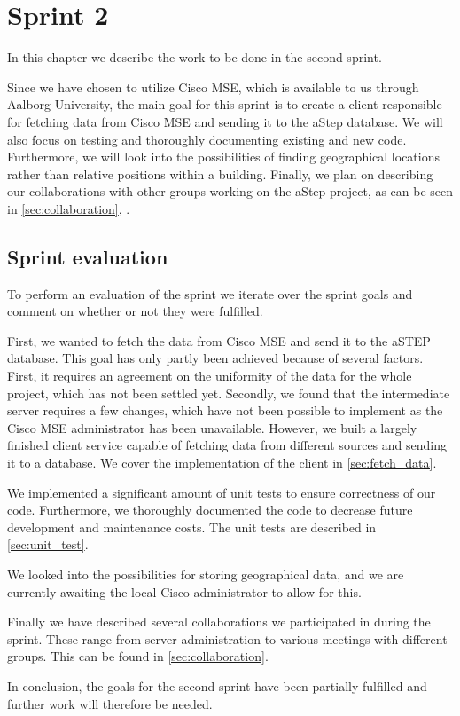 \chapter{Sprint 2} \label{cha:sprint2}
In this chapter we describe the work to be done in the second sprint. 

Since we have chosen to utilize Cisco MSE, which is available to us through Aalborg University, the main goal for this sprint is to create a client responsible for fetching data from Cisco MSE and sending it to the aStep database. We will also focus on testing and thoroughly documenting existing and new code. Furthermore, we will look into the possibilities of finding geographical locations rather than relative positions within a building. Finally, we plan on describing our collaborations with other groups working on the aStep project, as can be seen in \cref{sec:collaboration}, .





\section{Sprint evaluation}
To perform an evaluation of the sprint we iterate over the sprint goals and comment on whether or not they were fulfilled.

First, we wanted to fetch the data from Cisco MSE and send it to the aSTEP database. This goal has only partly been achieved because of several factors. First, it requires an agreement on the uniformity of the data for the whole project, which has not been settled yet. Secondly, we found that the intermediate server requires a few changes, which have not been possible to implement as the Cisco MSE administrator has been unavailable. However, we built a largely finished client service capable of fetching data from different sources and sending it to a database. We cover the implementation of the client in \cref{sec:fetch_data}.

We implemented a significant amount of unit tests to ensure correctness of our code. Furthermore, we thoroughly documented the code to decrease future development and maintenance costs. The unit tests are described in \cref{sec:unit_test}.

We looked into the possibilities for storing geographical data, and we are currently awaiting the local Cisco administrator to allow for this.

Finally we have described several collaborations we participated in during the sprint. These range from server administration to various meetings with different groups. This can be found in \cref{sec:collaboration}. 

In conclusion, the goals for the second sprint have been partially fulfilled and further work will therefore be needed.